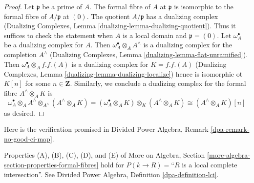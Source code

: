 \begin{proof}
Let $\mathfrak p$ be a prime of $A$. The formal fibre of $A$ at $\mathfrak p$
is isomorphic to the formal fibre of $A/\mathfrak p$ at $(0)$. The quotient
$A/\mathfrak p$ has a dualizing complex
(Dualizing Complexes, Lemma \ref{dualizing-lemma-dualizing-quotient}).
Thus it suffices to check the statement
when $A$ is a local domain and $\mathfrak p = (0)$.
Let $\omega_A^\bullet$ be a dualizing complex for $A$. Then
$\omega_A^\bullet \otimes_A A^\wedge$ is a dualizing complex
for the completion $A^\wedge$
(Dualizing Complexes, Lemma \ref{dualizing-lemma-flat-unramified}).
Then $\omega_A^\bullet \otimes_A f.f.(A)$ is a dualizing
complex for $K = f.f.(A)$
(Dualizing Complexes, Lemma \ref{dualizing-lemma-dualizing-localize})
hence is isomorphic ot $K[n]$ for some $n \in \mathbf{Z}$.
Similarly, we conclude a dualizing complex for the formal fibre
$A^\wedge \otimes_A K$ is
$$
\omega_A^\bullet \otimes_A A^\wedge \otimes_{A^\wedge} (A^\wedge \otimes_A K) =
(\omega_A^\bullet \otimes_A K) \otimes_K (A^\wedge \otimes_A K) \cong
(A^\wedge \otimes_A K)[n]
$$
as desired.
\end{proof}

\noindent
Here is the verification promised in
Divided Power Algebra, Remark \ref{dpa-remark-no-good-ci-map}.

\begin{lemma}
\label{lemma-formal-fibres-lci}
Properties (A), (B), (C), (D), and (E) of
More on Algebra, Section \ref{more-algebra-section-properties-formal-fibres}
hold for $P(k \to R) =$``$R$ is a local complete intersection''.
See Divided Power Algebra, Definition \ref{dpa-definition-lci}.
\end{lemma}

